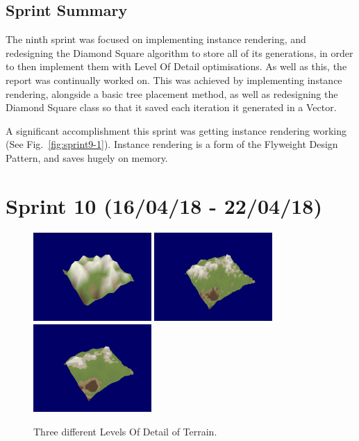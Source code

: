 \documentclass[a4paper,10pt]{report}
\begin{document}
\subsection{Sprint Summary}

The ninth sprint was focused on implementing instance rendering, and redesigning the Diamond Square algorithm to store all of its generations, in order to then implement them with Level Of Detail optimisations. As well as this, the report was continually worked on. This was achieved by implementing instance rendering, alongside a basic tree placement method, as well as redesigning the Diamond Square class so that it saved each iteration it generated in a Vector. \medskip

A significant accomplishment this sprint was getting instance rendering working (See Fig.~\ref{fig:sprint9-1}). Instance rendering is a form of the Flyweight Design Pattern, and saves hugely on memory.

\clearpage
\section{Sprint 10 (16/04/18 -  22/04/18)}

\begin{figure}[h!]
\centering
  \includegraphics[width=0.4\textwidth]{Images/Sprint-Images/Sprint10-1.png} \medskip
  \includegraphics[width=0.4\textwidth]{Images/Sprint-Images/Sprint10-2.png} \medskip
  \includegraphics[width=0.4\textwidth]{Images/Sprint-Images/Sprint10-3.png} \medskip
\caption{Three different Levels Of Detail of Terrain.}
\label{loddiamondsq}
\end{figure}
\end{document}
